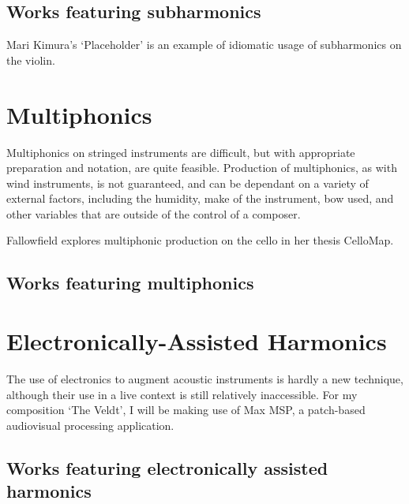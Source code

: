\subsection{Works featuring subharmonics}
Mari Kimura's `Placeholder' is an example of idiomatic usage of subharmonics on the violin. \lipsum[3]

\section{Multiphonics}
Multiphonics on stringed instruments are difficult, but with appropriate preparation and notation, are quite feasible. Production of multiphonics, as with wind instruments, is not guaranteed, and can be dependant on a variety of external factors, including the humidity, make of the instrument, bow used, and other variables that are outside of the control of a composer.

Fallowfield explores multiphonic production on the cello in her thesis CelloMap.\autocite{fallowfieldCelloMapHandbook2009} \lipsum[2]

\subsection{Works featuring multiphonics}
\lipsum[4]

\section{Electronically-Assisted Harmonics}
The use of electronics to augment acoustic instruments is hardly a new technique, although their use in a live context is still relatively inaccessible. For my composition `The Veldt', I will be making use of Max MSP, a patch-based audiovisual processing application. 

\subsection{Works featuring electronically assisted harmonics}
\lipsum[4]
